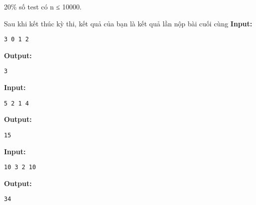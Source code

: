 20\% số test có n ≤ 10000.  

     Sau khi kết thúc kỳ thi, kết quả của bạn là kết quả lần nộp bài cuối cùng
\textbf{    Input:   }
\begin{verbatim}
3 0 1 2\end{verbatim}

\textbf{    Output:   }
\begin{verbatim}
3\end{verbatim}
\textbf{    Input:   }
\begin{verbatim}
5 2 1 4\end{verbatim}

\textbf{    Output:   }
\begin{verbatim}
15\end{verbatim}
\textbf{    Input:   }
\begin{verbatim}
10 3 2 10\end{verbatim}

\textbf{    Output:   }
\begin{verbatim}
34\end{verbatim}